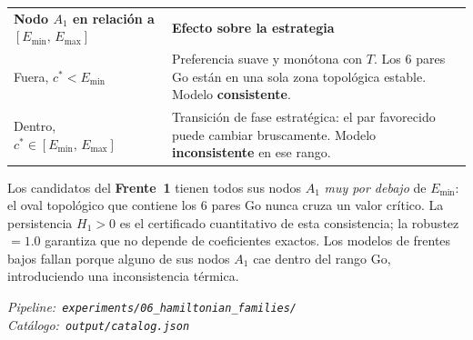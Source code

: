 \documentclass[11pt, a4paper]{article}
\newcommand{\TH}[1]{\cellcolor{cTHbg}\color{white}\textbf{#1}}
\begin{document}
\medskip
\begin{center}
\begin{tabularx}{0.96\textwidth}{L{4cm}X}
  \TH{Nodo $A_1$ en relaci\'on a $[E_{\min},\,E_{\max}]$}
    & \TH{Efecto sobre la estrategia} \\[1pt]
  Fuera, $c^* < E_{\min}$
    & Preferencia suave y mon\'otona con $T$.
      Los 6 pares Go est\'an en una sola zona topol\'ogica estable.
      Modelo \textbf{consistente}. \\
  Dentro, $c^* \in [E_{\min},\,E_{\max}]$
    & Transici\'on de fase estrat\'egica: el par favorecido puede cambiar
      bruscamente. Modelo \textbf{inconsistente} en ese rango. \\
\end{tabularx}
\end{center}

\medskip
Los candidatos del \textbf{Frente~1} tienen todos sus nodos $A_1$
\emph{muy por debajo} de $E_{\min}$: el oval topol\'ogico que contiene
los 6 pares Go nunca cruza un valor cr\'itico.
La persistencia $H_1>0$ es el certificado cuantitativo de esta consistencia;
la robustez $=1.0$ garantiza que no depende de coeficientes exactos.
Los modelos de frentes bajos fallan porque alguno de sus nodos $A_1$
cae dentro del rango Go, introduciendo una inconsistencia t\'ermica.

\vfill
{}\vspace{4pt}
{\color{cMuted}\small\itshape
  Pipeline:~\texttt{experiments/06\_hamiltonian\_families/}
  \quad\textbullet\quad
  Cat\'alogo:~\texttt{output/catalog.json}
}
\end{document}
